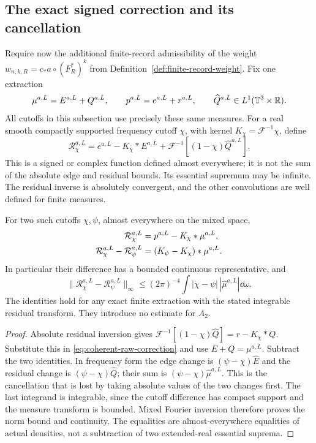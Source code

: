 \subsection{The exact signed correction and its cancellation}
Require now the additional finite-record admissibility of the weight
$w_{n,k,R}=c_*a\circ(F_R^*)^k$ from
Definition~\ref{def:finite-record-weight}. Fix one extraction
\[
 \mu^{a,L}=E^{a,L}+Q^{a,L},\qquad
 p^{a,L}=e^{a,L}+r^{a,L},\qquad
 \widehat Q^{a,L}\in L^1(\mathbb T^3\times\mathbb R).
\]
All cutoffs in this subsection use precisely these same measures.
For a real smooth compactly supported frequency cutoff $\chi$,
with kernel $K_\chi=\mathcal F^{-1}\chi$, define
\begin{equation}\label{eq:coherent-raw-correction}
 \mathcal R_\chi^{a,L}
 =e^{a,L}-K_\chi*E^{a,L}
       +\mathcal F^{-1}[(1-\chi)\widehat Q^{a,L}].
\end{equation}
This is a signed or complex function defined almost everywhere; it
is not the sum of the absolute edge and residual bounds. Its essential
supremum may be infinite. The residual inverse is absolutely convergent,
and the other convolutions are well defined for finite measures.

\begin{proposition}
\label{prop:exact-raw-cutoff-transport}
For two such cutoffs $\chi,\psi$, almost everywhere on the mixed
space,
\begin{align}
 \mathcal R_\chi^{a,L}&=p^{a,L}-K_\chi*\mu^{a,L},\notag\\
 \mathcal R_\chi^{a,L}-\mathcal R_\psi^{a,L}
             &=(K_\psi-K_\chi)*\mu^{a,L}.
 \label{eq:exact-raw-cutoff-transport}
\end{align}
In particular their difference has a bounded continuous representative,
and
\begin{equation}\label{eq:raw-cutoff-global-comparison}
 \|\mathcal R_\chi^{a,L}-\mathcal R_\psi^{a,L}\|_\infty
 \le(2\pi)^{-4}\int |\chi-\psi|\,|\widehat\mu^{a,L}|\dd\omega.
\end{equation}
The identities hold for any exact finite extraction with the stated
integrable residual transform. They introduce no estimate for $A_2$.
\end{proposition}
\begin{proof}
Absolute residual inversion gives
$\mathcal F^{-1}[(1-\chi)\widehat Q]=r-K_\chi*Q$.
Substitute this in \eqref{eq:coherent-raw-correction} and use
$E+Q=\mu^{a,L}$. Subtract the two identities. In frequency form the
edge change is $(\psi-\chi)\widehat E$ and the residual change is
$(\psi-\chi)\widehat Q$; their sum is
$(\psi-\chi)\widehat\mu^{a,L}$. This is the cancellation that is
lost by taking absolute values of the two changes first. The last
integrand is integrable, since the cutoff difference has compact
support and the measure transform is bounded. Mixed Fourier inversion
therefore proves the norm bound and continuity. The equalities are
almost-everywhere equalities of actual densities, not a subtraction
of two extended-real essential suprema.
\end{proof}

